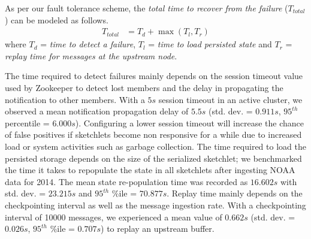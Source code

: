 As per our fault tolerance scheme, the \textit{total time to recover from the failure} ($T_{total}$) can be modeled as follows.
\begin{align*}
    T_{total} &= T_{d} + \max{(T_{l}, T_{r})}      
\end{align*}
where $T_{d}$ = \textit{time to detect a failure}, $T_{l}$ = \textit{time to load persisted state} and $T_{r}$ = \textit{replay time for messages at the upstream node}.

The time required to detect failures mainly depends on the session timeout value used by Zookeeper to detect lost members and the delay in propagating the notification to other members. With a $5s$ session timeout in an active cluster, we observed a mean notification propagation delay of $5.5s$ (std. dev. = $0.911s$, $95^{th}$ percentile = $6.000s$). Configuring a lower session timeout will increase the chance of false positives if sketchlets become non responsive for a while due to increased load or system activities such as garbage collection. The time required to load the persisted storage depends on the size of the serialized sketchlet; we benchmarked the time it takes to repopulate the state in all sketchlets after ingesting NOAA data for 2014. The mean state re-population time was recorded as $16.602s$ with std. dev. = $23.215s$ and $95^{th}$ \%ile = $70.877s$. Replay time mainly depends on the checkpointing interval as well as the message ingestion rate. With a checkpointing interval of 10000 messages, we experienced a mean value of $0.662s$ (std. dev. = $0.026s$, $95^{th}$ \%ile = $0.707s$) to replay an upstream buffer.
